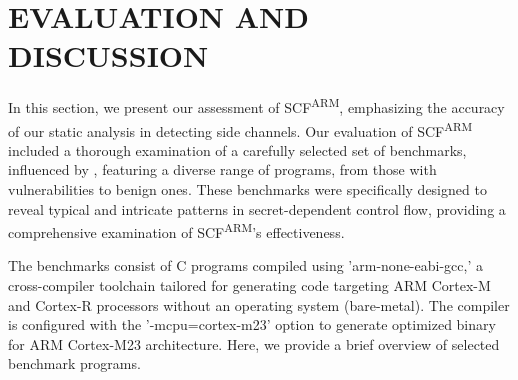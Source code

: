 \section{EVALUATION AND DISCUSSION}

In this section, we present our assessment of \gls{SCF}\textsuperscript{ARM}, emphasizing the accuracy of our static analysis in detecting side channels. Our evaluation of \gls{SCF}\textsuperscript{ARM} included a thorough examination of a carefully selected set of benchmarks, influenced by \cite{hans}, featuring a diverse range of programs, from those with vulnerabilities to benign ones. These benchmarks were specifically designed to reveal typical and intricate patterns in secret-dependent control flow, providing a comprehensive examination of \gls{SCF}\textsuperscript{ARM}'s effectiveness. 

The benchmarks consist of C programs compiled using 'arm-none-eabi-gcc,' a cross-compiler toolchain tailored for generating code targeting ARM Cortex-M and Cortex-R processors without an operating system (bare-metal). The compiler is configured with the '-mcpu=cortex-m23' option to generate optimized binary for ARM Cortex-M23 architecture. Here, we provide a brief overview of selected benchmark programs. 

